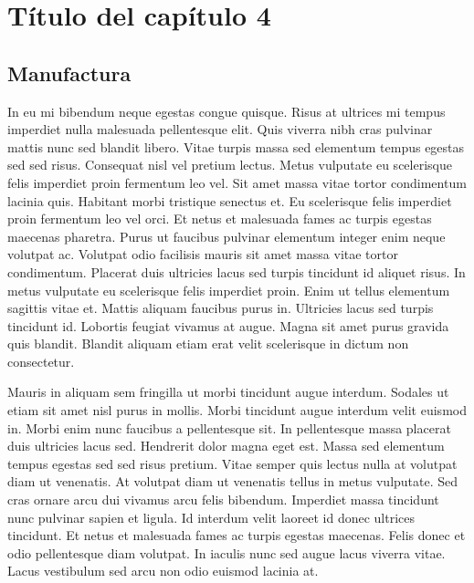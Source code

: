 
\pagestyle{myportland}
\doublespacing
\chapter[----- Título del capítulo 4]{Título del capítulo 4}
\thispagestyle{myportland}

\section{Manufactura}

In eu mi bibendum neque egestas congue quisque. Risus at ultrices mi tempus imperdiet nulla malesuada pellentesque elit. Quis viverra nibh cras pulvinar mattis nunc sed blandit libero. Vitae turpis massa sed elementum tempus egestas sed sed risus. Consequat nisl vel pretium lectus. Metus vulputate eu scelerisque felis imperdiet proin fermentum leo vel. Sit amet massa vitae tortor condimentum lacinia quis. Habitant morbi tristique senectus et. Eu scelerisque felis imperdiet proin fermentum leo vel orci. Et netus et malesuada fames ac turpis egestas maecenas pharetra. Purus ut faucibus pulvinar elementum integer enim neque volutpat ac. Volutpat odio facilisis mauris sit amet massa vitae tortor condimentum. Placerat duis ultricies lacus sed turpis tincidunt id aliquet risus. In metus vulputate eu scelerisque felis imperdiet proin. Enim ut tellus elementum sagittis vitae et. Mattis aliquam faucibus purus in. Ultricies lacus sed turpis tincidunt id. Lobortis feugiat vivamus at augue. Magna sit amet purus gravida quis blandit. Blandit aliquam etiam erat velit scelerisque in dictum non consectetur.

Mauris in aliquam sem fringilla ut morbi tincidunt augue interdum. Sodales ut etiam sit amet nisl purus in mollis. Morbi tincidunt augue interdum velit euismod in. Morbi enim nunc faucibus a pellentesque sit. In pellentesque massa placerat duis ultricies lacus sed. Hendrerit dolor magna eget est. Massa sed elementum tempus egestas sed sed risus pretium. Vitae semper quis lectus nulla at volutpat diam ut venenatis. At volutpat diam ut venenatis tellus in metus vulputate. Sed cras ornare arcu dui vivamus arcu felis bibendum. Imperdiet massa tincidunt nunc pulvinar sapien et ligula. Id interdum velit laoreet id donec ultrices tincidunt. Et netus et malesuada fames ac turpis egestas maecenas. Felis donec et odio pellentesque diam volutpat. In iaculis nunc sed augue lacus viverra vitae. Lacus vestibulum sed arcu non odio euismod lacinia at.


